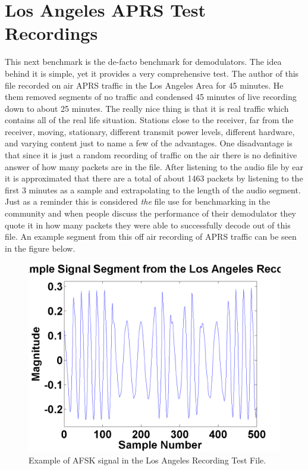 \section{Los Angeles APRS Test Recordings}
This next benchmark is the de-facto benchmark for demodulators. The idea behind it is simple, yet it provides a very comprehensive test. The author of this file recorded on air APRS traffic in the Los Angeles Area for 45 minutes. He them removed segments of no traffic and condensed 45 minutes of live recording down to about 25 minutes. The really nice thing is that it is real traffic which contains all of the real life situation. Stations close to the receiver, far from the receiver, moving, stationary, different transmit power levels, different hardware, and varying content just to name a few of the advantages. One disadvantage is that since it is just a random recording of traffic on the air there is no definitive answer of how many packets are in the file. After listening to the audio file by ear it is approximated that there are a total of about 1463 packets by listening to the first 3 minutes as a sample and extrapolating to the length of the audio segment. Just as a reminder this is considered \textit{the} file use for benchmarking in the community and when people discuss the performance of their demodulator they quote it in how many packets they were able to successfully decode out of this file. An example segment from this off air recording of APRS traffic can be seen in the figure below.
\begin{figure}
  \centering
	\includegraphics[width=0.75\linewidth]{images/ExampleSignalSegmentfromtheLosAngelesRecording.png} 
	\caption{Example of AFSK signal in the Los Angeles Recording Test File.}
\end{figure}

